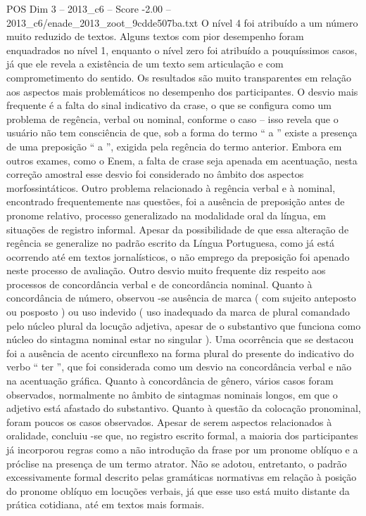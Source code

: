 \begin{textsample}{POS Dim 3 – 2013\_c6 – Score -2.00 – 2013\_c6/enade\_2013\_zoot\_9cdde507ba.txt}
O nível 4 foi atribuído a um número muito reduzido de textos.
Alguns textos com pior desempenho foram enquadrados no nível 1, enquanto o nível zero foi atribuído a pouquíssimos casos, já que ele revela a existência de um texto sem articulação e com comprometimento do sentido.
Os resultados são muito transparentes em relação aos aspectos mais problemáticos no desempenho dos participantes.
O desvio mais frequente é a falta do sinal indicativo da crase, o que se configura como um problema de regência, verbal ou nominal, conforme o caso – isso revela que o usuário não tem consciência de que, sob a forma do termo “ a ” existe a presença de uma preposição “ a ”, exigida pela regência do termo anterior.
Embora em outros exames, como o Enem, a falta de crase seja apenada em acentuação, nesta correção amostral esse desvio foi considerado no âmbito dos aspectos morfossintáticos.
Outro problema relacionado à regência verbal e à nominal, encontrado frequentemente nas questões, foi a ausência de preposição antes de pronome relativo, processo generalizado na modalidade oral da língua, em situações de registro informal.
Apesar da possibilidade de que essa alteração de regência se generalize no padrão escrito da Língua Portuguesa, como já está ocorrendo até em textos jornalísticos, o não emprego da preposição foi apenado neste processo de avaliação.
Outro desvio muito frequente diz respeito aos processos de concordância verbal e de concordância nominal.
Quanto à concordância de número, observou -se ausência de marca ( com sujeito anteposto ou posposto ) ou uso indevido ( uso inadequado da marca de plural comandado pelo núcleo plural da locução adjetiva, apesar de o substantivo que funciona como núcleo do sintagma nominal estar no singular ).
Uma ocorrência que se destacou foi a ausência de acento circunflexo na forma plural do presente do indicativo do verbo “ ter ”, que foi considerada como um desvio na concordância verbal e não na acentuação gráfica.
Quanto à concordância de gênero, vários casos foram observados, normalmente no âmbito de sintagmas nominais longos, em que o adjetivo está afastado do substantivo.
Quanto à questão da colocação pronominal, foram poucos os casos observados.
Apesar de serem aspectos relacionados à oralidade, concluiu -se que, no registro escrito formal, a maioria dos participantes já incorporou regras como a não introdução da frase por um pronome oblíquo e a próclise na presença de um termo atrator.
Não se adotou, entretanto, o padrão excessivamente formal descrito pelas gramáticas normativas em relação à posição do pronome oblíquo em locuções verbais, já que esse uso está muito distante da prática cotidiana, até em textos mais formais.

\end{textsample}
